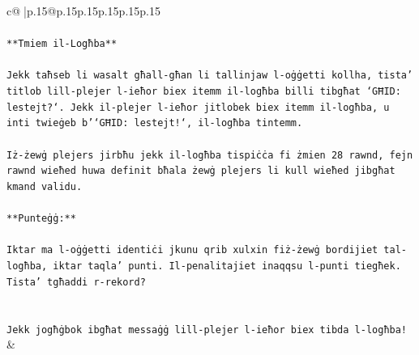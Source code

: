 \documentclass{article}
\begin{document}
{\begin{supertabular}{c@{$\;$}|p{.15\linewidth}@{}p{.15\linewidth}p{.15\linewidth}p{.15\linewidth}p{.15\linewidth}p{.15\linewidth}}
{{{\\ 
\\ 
\texttt{**Tmiem il{-}Logħba**} \\
\\ 
\texttt{Jekk taħseb li wasalt għall{-}għan li tallinjaw l{-}oġġetti kollha, tista' titlob lill{-}plejer l{-}ieħor biex itemm il{-}logħba billi tibgħat `GĦID: lestejt?`. Jekk il{-}plejer l{-}ieħor jitlobek biex itemm il{-}logħba, u inti twieġeb b'`GĦID: lestejt!`, il{-}logħba tintemm.} \\
\\ 
\texttt{Iż{-}żewġ plejers jirbħu jekk il{-}logħba tispiċċa fi żmien 28 rawnd, fejn rawnd wieħed huwa definit bħala żewġ plejers li kull wieħed jibgħat kmand validu.} \\
\\ 
\texttt{**Punteġġ:**} \\
\\ 
\texttt{Iktar ma l{-}oġġetti identiċi jkunu qrib xulxin fiż{-}żewġ bordijiet tal{-}logħba, iktar taqla' punti. Il{-}penalitajiet inaqqsu l{-}punti tiegħek. Tista' tgħaddi r{-}rekord?} \\
\\ 
\\ 
\texttt{Jekk jogħġbok ibgħat messaġġ lill{-}plejer l{-}ieħor biex tibda l{-}logħba!} \\
            }
        }
    }
    & \\ \\


\end{supertabular}}
\end{document}
